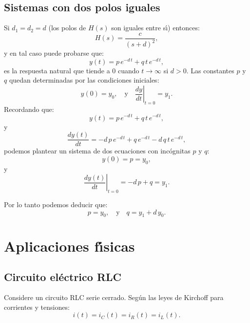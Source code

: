 \documentclass[11pt,a4paper,openany]{book}
\begin{document}
\subsection{Sistemas con dos polos iguales}

Si $d_{1}=d_{2}=d$ (los polos de $H(s)$ son iguales entre s\'{\i}) entonces: 
\begin{equation}
	H\left( s\right) = \frac{c}{\left( s+d\right) ^{2}},
\end{equation}
y en tal caso puede probarse que:
\begin{equation}
	y\left( t\right) = p \, e^{-d \, t} + q \, t \, e^{-d \, t},
\end{equation}
es la respuesta natural que tiende a $0$ cuando $t \rightarrow \infty$ si $d > 0$. Las constantes $p$ y $q$ quedan determinadas por las condiciones iniciales:
\begin{equation}
	y(0) = y_{0}, \quad \text{y} \quad \left. \frac{dy}{dt} \right|_{t=0} = y_{1}.
\end{equation} 
Recordando que:
\begin{equation}
	y(t) = p \, e^{-d \, t} + q \, t \, e^{-d \, t},
\end{equation}
y
\begin{equation}
	\frac{dy(t)}{dt} = - d \, p \, e^{-d \, t} + q \, e^{-d \, t} - d \, q \, t \, e^{-d \, t},
\end{equation}
podemos plantear un sistema de dos ecuaciones con incógnitas $p$ y $q$:
\begin{equation}
	y(0) = p = y_{0},
\end{equation}
y
\begin{equation}
	\left. \frac{dy(t)}{dt} \right|_{t=0} = -d \, p + q = y_{1}.
\end{equation}

Por lo tanto podemos deducir que:
\begin{equation}
	p = y_{0}, \quad \text{y} \quad q = y_{1} + d \, y_{0}.
\end{equation}

\section{Aplicaciones f\'{\i}sicas}

\subsection{Circuito el\'{e}ctrico RLC}

Considere un circuito RLC serie cerrado. Seg\'{u}n las leyes de Kirchoff para corrientes y tensiones:
\begin{equation}
	i(t) = i_{C}(t) = i_{R}(t) = i_{L}(t).
\end{equation}
\end{document}
